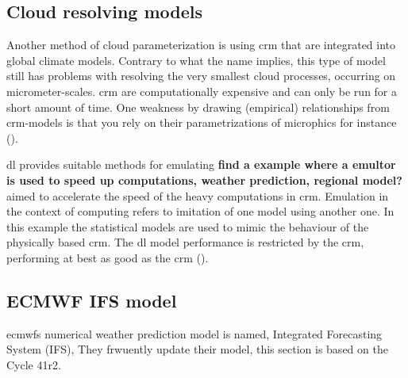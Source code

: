 \subsection{Cloud resolving models} \label{sec:params_climate_models}
Another method of cloud parameterization is using \acrfull{crm} that are integrated into global climate models. Contrary to what the name implies, this type of model still has problems with resolving the very smallest cloud processes, occurring on micrometer-scales. 
\acrshort{crm} are computationally expensive and can only be run for a short amount of time. One weakness by drawing (empirical) relationships from \acrshort{crm}-models is that you rely on their parametrizations of microphics for instance (\cite{Tomkins2005}).


\acrshort{dl} provides suitable methods for emulating \textbf{find a example where a emultor is used to speed up computations, weather prediction, regional model?} 
aimed to accelerate the speed of the heavy computations in \acrshort{crm}. Emulation in the context of computing refers to imitation of one model using another one. In this example the statistical models are used to mimic the behaviour of the physically based \acrshort{crm}. The \acrshort{dl} model performance is restricted by the  \acrshort{crm}, performing at best as good as the \acrshort{crm} (\cite{Rasp2018DeepModels}).

\subsection{ECMWF IFS model} \label{sec:era5_param}
\acrfull{ecmwf}s numerical weather prediction model is named, Integrated Forecasting System (IFS), They frwuently update their model, this section is based on the Cycle 41r2. 

